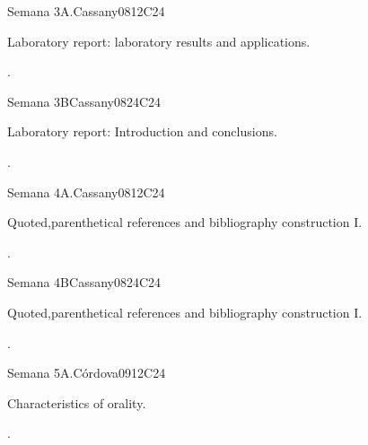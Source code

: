 \begin{syllabus}
\begin{unit}{Semana 3A.}{}{Cassany08}{12}{C24}
   \begin{topics}
      \item Laboratory report: laboratory results and applications. 
   \end{topics}
   \begin{learningoutcomes}
      \item .
   \end{learningoutcomes}
\end{unit}

\begin{unit}{Semana 3B}{}{Cassany08}{24}{C24}
   \begin{topics}
      \item Laboratory report: Introduction and conclusions. 
   \end{topics}

   \begin{learningoutcomes}
      \item .
      \end{learningoutcomes}
\end{unit}

\begin{unit}{Semana 4A.}{}{Cassany08}{12}{C24}
   \begin{topics}
      \item Quoted,parenthetical references and bibliography construction I. 
   \end{topics}
   \begin{learningoutcomes}
      \item .
   \end{learningoutcomes}
\end{unit}

\begin{unit}{Semana 4B}{}{Cassany08}{24}{C24}
   \begin{topics}
      \item Quoted,parenthetical references and bibliography construction I.
   \end{topics}

   \begin{learningoutcomes}
      \item .
      \end{learningoutcomes}
\end{unit}


\begin{unit}{Semana 5A.}{}{Córdova09}{12}{C24}
   \begin{topics}
      \item Characteristics of orality.
   \end{topics}
   \begin{learningoutcomes}
      \item .
   \end{learningoutcomes}
\end{unit}


\end{syllabus}
